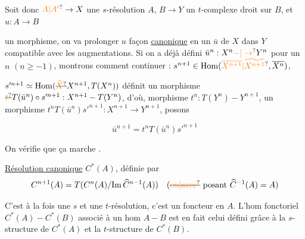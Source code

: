 
 Soit donc $\unsure{A|A'}\to X$ une $s$-résolution  $A$, $B\to Y$ un $t$-complexe droit sur $B$, et $u:A\to B$

un morphisme, on va prolonger $u$  façon \uline{canonique} en un  $\bar u$ de $X$ dans $Y$ compatible avec les augmentations. Si on a déjà défini $\bar u^n:X^n\unsure{-|\to}Y^n$  pour un $n$ $(n\geq-1)$, montrons comment continuer :  $s^{n+1}\in\mathrm{Hom}(\unsure{\overline{X^{n+1}}|\widetilde{X^{n+1}}},\overline{X^n})$,


  $s'^{n+1}\simeq\mathrm{Hom}(\deleted{\unsure{\widetilde X}}X^{n+1},T(X^n))$ définit un  morphisme $\deleted{\unsure{t}}T(\bar u^n)\circ s'^{n+1}:X^{n+1}-T(Y^n)$, d'où,   morphisme $t^n:T(Y^n)-Y^{n+1}$, un morphisme  $t^nT(\bar u^n)s'^{n+1}:X^{n+1}\to Y^{n+1}$, posons

\[
\bar u^{n+1}=t^nT(\bar u^n)s'^{n+1}
\]


On vérifie que ça marche \unsure{\ldots}.

\uline{Résolution canonique} $C^*(A)$, définie par
\[
C^{n+1}(A)=T(C^n(A)/\mathrm{Im}\,\widehat C^{n-1}(A))\quad (\deleted{\unsure{en|\text{avec}}}\ \text{posant }\widehat C^{-1}(A)=A)
\]

 C'est à la fois une $s$ et une $t$-résolution, c'est un foncteur en $A$. L'hom fonctoriel $C^*(A)-C^*(B)$ associé à un hom $A-B$ est en fait celui défini grâce à la $s$-structure de $C^*(A)$ et la $t$-structure de $C^*(B)$.

